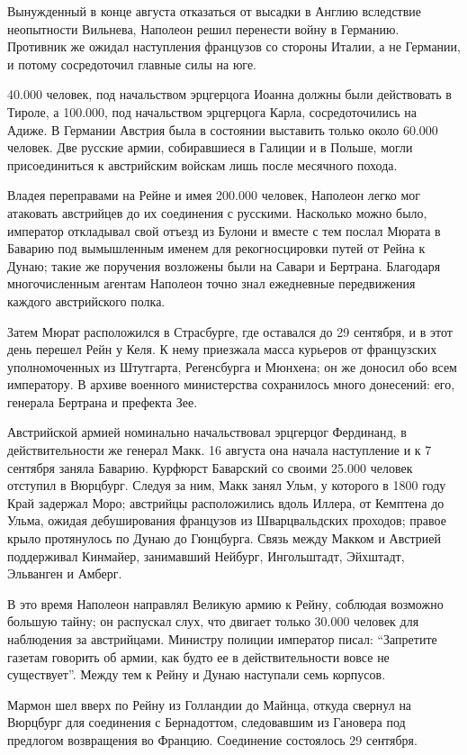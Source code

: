 \documentclass[
  oneside,
  12pt,
  titlepage]{book}
\begin{document}
Вынужденный в конце августа отказаться от высадки в Англию вследствие неопытности Вильнева, Наполеон решил перенести войну в Германию. Противник же ожидал наступления французов со стороны Италии, а не Германии, и потому сосредоточил главные силы на юге.

40.000 человек, под начальством эрцгерцога Иоанна должны были действовать в Тироле, а 100.000, под начальством эрцгерцога Карла, сосредоточились на Адиже. В Германии Австрия была в состоянии выставить только около 60.000 человек. Две русские армии, собиравшиеся в Галиции и в Польше, могли присоединиться к австрийским войскам лишь после месячного похода.

Владея переправами на Рейне и имея 200.000 человек, Наполеон легко мог атаковать австрийцев до их соединения с русскими. Насколько можно было, император откладывал свой отъезд из Булони и вместе с тем послал Мюрата в Баварию под вымышленным именем для рекогносцировки путей от Рейна к Дунаю; такие же поручения возложены были на Савари и Бертрана. Благодаря многочисленным агентам Наполеон точно знал ежедневные передвижения каждого австрийского полка.

Затем Мюрат расположился в Страсбурге, где оставался до 29 сентября, и в этот день перешел Рейн у Келя. К нему приезжала масса курьеров от французских уполномоченных из Штутгарта, Регенсбурга и Мюнхена; он же доносил обо всем императору. В архиве военного министерства сохранилось много донесений: его, генерала Бертрана и префекта Зее.

Австрийской армией номинально начальствовал эрцгерцог Фердинанд, в действительности же генерал Макк. 16 августа она начала наступление и к 7 сентября заняла Баварию. Курфюрст Баварский со своими 25.000 человек отступил в Вюрцбург. Следуя за ним, Макк занял Ульм, у которого в 1800 году Край задержал Моро; австрийцы расположились вдоль Иллера, от Кемптена до Ульма, ожидая дебуширования французов из Шварцвальдских проходов; правое крыло протянулось по Дунаю до Гюнцбурга. Связь между Макком и Австрией поддерживал Кинмайер, занимавший Нейбург, Ингольштадт, Эйхштадт, Эльванген и Амберг.

В это время Наполеон направлял Великую армию к Рейну, соблюдая возможно большую тайну; он распускал слух, что двигает только 30.000 человек для наблюдения за австрийцами. Министру полиции император писал: ``Запретите газетам говорить об армии, как будто ее в действительности вовсе не существует''. Между тем к Рейну и Дунаю наступали семь корпусов.

Мармон шел вверх по Рейну из Голландии до Майнца, откуда свернул на Вюрцбург для соединения с Бернадоттом, следовавшим из Гановера под предлогом возвращения во Францию. Соединение состоялось 29 сентября.
\end{document}
